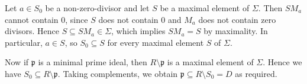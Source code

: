 Let $a \in S_0$ be a non-zero-divisor and let $S$ be a maximal element of $\Sigma$.
Then $SM_a$ cannot contain $0$, since $S$ does not contain $0$ and $M_a$
does not contain zero divisors. Hence $S \subseteq SM_a \in \Sigma$, which
implies $SM_a = S$ by maximality. In particular, $a \in S$, so $S_0 \subseteq S$
for every maximal element $S$ of $\Sigma$.

Now if $\mathfrak{p}$ is a minimal prime ideal, then $R\setminus \mathfrak{p}$ is a maximal
element of $\Sigma$. Hence we have $S_0 \subseteq R\setminus \mathfrak{p}$. Taking
complements, we obtain $\mathfrak{p} \subseteq R \setminus S_0 = D$ as required.
